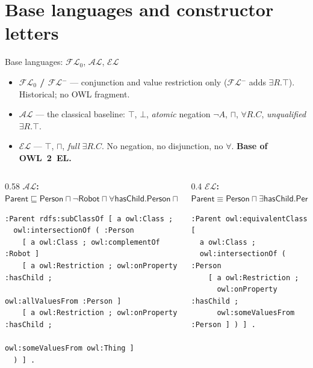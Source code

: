 \documentclass[10pt,aspectratio=169,xcolor=table]{beamer}
\newcommand{\dl}[1]{\ensuremath{\mathcal{#1}}}
\newcommand{\EL}{\dl{EL}}
\newcommand{\AL}{\dl{AL}}
\newcommand{\cn}[1]{\mathsf{#1}}
\newcommand{\rn}[1]{\mathsf{#1}}
\newcommand{\sub}{\sqsubseteq}
\newcommand{\eqv}{\equiv}
\newcommand{\hl}[1]{\textcolor{accent}{\textbf{#1}}}
\begin{document}
\section{Base languages and constructor letters}

\begin{frame}[fragile]{Base languages: \dl{FL}$_0$, \AL, \EL}
  \small
  \begin{itemize}
    \item \textbf{\dl{FL}$_0$ / \dl{FL}$^-$} --- conjunction and value restriction only
      (\dl{FL}$^-$ adds $\exists R.\top$). Historical; no OWL fragment.
    \item \textbf{\AL} --- the classical baseline: $\top$, $\bot$, \emph{atomic} negation
      $\neg A$, $\sqcap$, $\forall R.C$, \emph{unqualified} $\exists R.\top$.
    \item \textbf{\EL} --- $\top$, $\sqcap$, \emph{full} $\exists R.C$. No negation,
      no disjunction, no $\forall$. \hl{Base of OWL~2~EL.}
  \end{itemize}
  \begin{columns}[T]
    \begin{column}{0.58\textwidth}
      \scriptsize \textbf{\AL:}
      $\cn{Parent} \sub \cn{Person} \sqcap \neg\cn{Robot} \sqcap
       \forall \rn{hasChild}.\cn{Person} \sqcap \exists \rn{hasChild}.\top$\\[2pt]
\begin{lstlisting}
:Parent rdfs:subClassOf [ a owl:Class ;
  owl:intersectionOf ( :Person
    [ a owl:Class ; owl:complementOf :Robot ]
    [ a owl:Restriction ; owl:onProperty :hasChild ;
                          owl:allValuesFrom :Person ]
    [ a owl:Restriction ; owl:onProperty :hasChild ;
                          owl:someValuesFrom owl:Thing ]
  ) ] .
\end{lstlisting}
    \end{column}
    \begin{column}{0.4\textwidth}
      \scriptsize \textbf{\EL:}
      $\cn{Parent} \eqv \cn{Person} \sqcap \exists \rn{hasChild}.\cn{Person}$\\[2pt]
\begin{lstlisting}
:Parent owl:equivalentClass [
  a owl:Class ;
  owl:intersectionOf ( :Person
    [ a owl:Restriction ;
      owl:onProperty :hasChild ;
      owl:someValuesFrom :Person ] ) ] .
\end{lstlisting}
    \end{column}
  \end{columns}
\end{frame}
\end{document}
